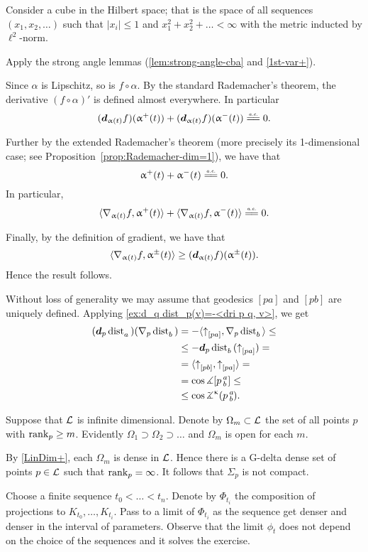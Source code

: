 Consider a cube in the Hilbert space;
that is the space of all sequences $(x_1,x_2,\dots)$ such that $|x_i|\le 1$ and $x_1^2+x_2^2+\dots<\infty$ with the metric inducted by $\ell^2$-norm.

 Apply the strong angle lemmas
(\ref{lem:strong-angle-cba}
and \ref{1st-var+}).


Since $\alpha$ is Lipschitz, so is $f\circ\alpha$.
By the standard Rademacher's theorem, the derivative $(f\circ\alpha)'$ is defined almost everywhere.
In particular 
\[(\dd_{\alpha(t)}f)(\alpha^+(t))+(\dd_{\alpha(t)}f)(\alpha^-(t))\ae0.\]

Further by the extended Rademacher's theorem (more precisely its 1-dimensional case; see Proposition~\ref{prop:Rademacher-dim=1}),
we have that
\[\alpha^+(t)+\alpha^-(t)\ae0.\]
In particular,
\[\<\nabla_{\alpha(t)}f,\alpha^+(t)\>+\<\nabla_{\alpha(t)}f,\alpha^-(t)\>
\ae0.\]

Finally, by the definition of gradient, we have that 
\[\<\nabla_{\alpha(t)}f,\alpha^\pm(t)\>\ge (\dd_{\alpha(t)}f)(\alpha^\pm(t)).\]
Hence the result follows.

Without loss of generality we may assume that geodesics $[pa]$ and $[pb]$ are uniquely defined.
Applying \ref{ex:d_q dist_p(v)=-<dri p q, v>}, we get
\begin{align*}(\dd_p\distfun{a}{}{})(\nabla_p\distfun{b}{}{})&=-\langle\dir pa,\nabla_p\distfun{b}{}{} \rangle\le
\\
&\le -\dd_p\distfun{b}{}{}(\dir pa)=
\\
&=\langle\dir pb, \dir pa\rangle=
\\
&= \cos\mangle\hinge p a b \le 
\\
&\le \cos\angk\kappa p a b.
\end{align*}


Suppose that $\mathcal{L}$ is infinite dimensional.
Denote by $\Omega_m\subset \spc{L}$ the set of all points $p$ with $\rank_p\ge m$.
Evidently $\Omega_1\supset \Omega_2\supset\dots$ and $\Omega_m$ is open for each $m$.

By \ref{LinDim+}, each $\Omega_m$ is dense in $\mathcal{L}$.
Hence there is a G-delta dense set of points $p\in\spc{L}$ such that $\mathop{\rm rank}\nolimits_p=\infty$.
It follows that $\Sigma_p$ is not compact.

Choose a finite sequence $t_0<\dots<t_n$.
Denote by $\Phi_{t_i}$ the composition of projections to $K_{t_0},\dots, K_{t_i}$.
Pass to a limit of $\Phi_{t_i}$ as the sequence get denser and denser in the interval of parameters.
Observe that the limit $\phi_t$ does not depend on the choice of the sequences and it solves the exercise. 


